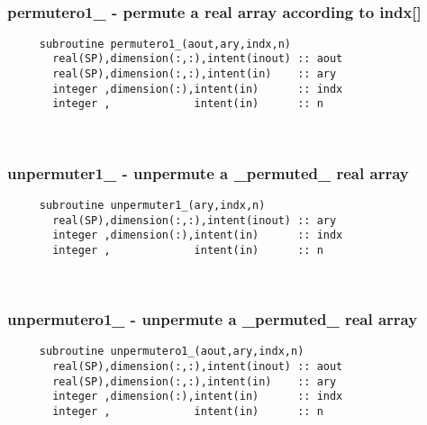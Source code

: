  
\mbox{}\hrulefill\ 
 
  \subsubsection{permutero1\_ - permute a real array according to indx[]}

\begin{verbatim} 
     subroutine permutero1_(aout,ary,indx,n)
       real(SP),dimension(:,:),intent(inout) :: aout
       real(SP),dimension(:,:),intent(in)    :: ary
       integer ,dimension(:),intent(in)      :: indx
       integer ,             intent(in)      :: n
 \end{verbatim}%
 
 
\mbox{}\hrulefill\ 

  \subsubsection{unpermuter1\_ - unpermute a \_permuted\_ real array}

\begin{verbatim} 
     subroutine unpermuter1_(ary,indx,n)
       real(SP),dimension(:,:),intent(inout) :: ary
       integer ,dimension(:),intent(in)      :: indx
       integer ,             intent(in)      :: n
 \end{verbatim}%
 
 
\mbox{}\hrulefill\ 
 

  \subsubsection{unpermutero1\_ - unpermute a \_permuted\_ real array}

\begin{verbatim} 
     subroutine unpermutero1_(aout,ary,indx,n)
       real(SP),dimension(:,:),intent(inout) :: aout
       real(SP),dimension(:,:),intent(in)    :: ary
       integer ,dimension(:),intent(in)      :: indx
       integer ,             intent(in)      :: n
 \end{verbatim}%
 
